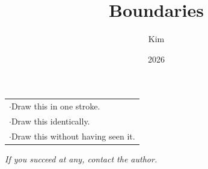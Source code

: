 \documentclass[11pt,a4paper]{article}
\title{\textbf{Boundaries}}
\author{Kim}
\date{2026}
\begin{document}
\maketitle

\vfill

\begin{center}
\end{center}

\vspace{2cm}

\begin{center}
\begin{tabular}{@{}l@{}}
$\cdot$\enspace Draw this in one stroke. \\[8pt]
$\cdot$\enspace Draw this identically. \\[8pt]
$\cdot$\enspace Draw this without having seen it.
\end{tabular}
\end{center}

\vspace{2cm}

\begin{center}
\emph{If you succeed at any, contact the author.}
\end{center}

\vfill

\end{document}
